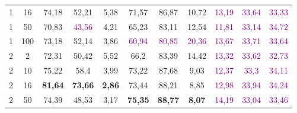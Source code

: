 \begin{table}[ht]
\begin{tabular}{cc|ccc|ccc|ccc}
        {1}                           & {16}   & {74,18}                             & {52,21}                             & {5,38}                                   & {71,57}                   & {86,87}                   & {10,72}                   & \textcolor{purple}{13,19} & \textcolor{purple}{33,64} & \textcolor{purple}{33,33} \\
        {1}                           & {50}   & {70,83}                             & \textcolor{purple}{43,56}           & {4,21}                                   & {65,23}                   & {83,11}                   & {12,54}                   & \textcolor{purple}{11,81} & \textcolor{purple}{33,14} & \textcolor{purple}{34,72} \\
        {1}                           & {100}  & {73,18}                             & {52,14}                             & {3,86}                                   & \textcolor{purple}{60,94} & \textcolor{purple}{80,85} & \textcolor{purple}{20,36} & \textcolor{purple}{13,67} & \textcolor{purple}{33,71} & \textcolor{purple}{33,64} \\
        {2}                           & {2}    & {72,31}                             & {50,42}                             & {5,52}                                   & {66,2}                    & {83,39}                   & {14,42}                   & \textcolor{purple}{13,32} & \textcolor{purple}{33,62} & \textcolor{purple}{32,73} \\
        {2}                           & {10}   & {75,22}                             & {58,4}                              & {3,99}                                   & {73,22}                   & {87,68}                   & {9,03}                    & \textcolor{purple}{12,37} & \textcolor{purple}{33,3}  & \textcolor{purple}{34,11} \\
        {2}                           & {16}   & {\textbf{81,64}}                    & {\textbf{73,66}}                    & {\textbf{2,86}}                          & {73,44}                   & {88,21}                   & {8,85}                    & \textcolor{purple}{12,98} & \textcolor{purple}{33,94} & \textcolor{purple}{34,24} \\
        {2}                           & {50}   & {74,39}                             & {48,53}                             & {3,17}                                   & {\textbf{75,35}}          & \textbf{88,77}            & \textbf{8,07}             & \textcolor{purple}{14,19} & \textcolor{purple}{33,04} & \textcolor{purple}{33,46} \\

\end{tabular}
\end{table}
